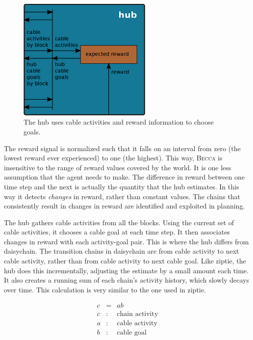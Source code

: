 \documentclass[oneside,twocolumn]{article}
\begin{document}
\begin{figure}[ht]
\centering
\includegraphics[height=6.0cm]{figs/hub.png}
\caption{The hub uses cable activities and reward information to choose goals.}
\label{hub}
\end{figure}

The reward signal is normalized such that it falls on an interval from zero (the lowest reward ever experienced) to one (the highest). This way, \textsc{Becca} is insensitive to the range of reward values covered by the world. It is one less assumption that the agent needs to make. The  difference in reward between one time step and the next is actually the quantity that the hub estimates. In this way it detects {\em changes} in reward, rather than constant values. The chains that consistently result in changes in reward are identified and exploited in planning. 
 
The hub gathers cable activities from all the blocks. Using the current set of cable activities, it chooses a cable goal at each time step. It then associates changes in reward with each activity-goal pair. This is where the hub differs from daisychain. The transition chains in daisychain are from cable activity to next cable activity, rather than from cable activity to next cable goal. Like ziptie, the hub does this incrementally, adjusting the estimate by a small amount each time. It also creates a running sum of each chain's activity history, which slowly decays over time. This calculation is very similar to the one used in ziptie.

\begin{eqnarray*}
c &= & ab\\ 
c &:& \mbox{chain activity} \\
a &:& \mbox{cable activity} \\
b &:& \mbox{cable goal}\\
\end{eqnarray*}
\end{document}
